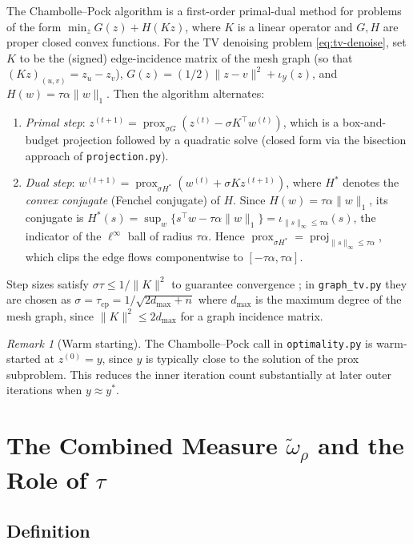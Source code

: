 \documentclass[11pt]{article}
\newcommand{\proj}{\operatorname{proj}}
\newcommand{\prox}{\operatorname{prox}}
\theoremstyle{plain}
\theoremstyle{remark}
\newtheorem{remark}{Remark}
\begin{document}
The Chambolle--Pock algorithm \cite{ChaPoc11} is a first-order primal-dual
method for problems of the form $\min_z G(z) + H(Kz)$, where $K$ is a linear
operator and $G,H$ are proper closed convex functions.  For the TV denoising
problem \eqref{eq:tv-denoise}, set $K$ to be the (signed) edge-incidence
matrix of the mesh graph (so that $(Kz)_{(u,v)} = z_u - z_v$), $G(z) =
(1/2)\|z-v\|^2 + \iota_{\mathcal{Y}}(z)$, and $H(w) = \tau\alpha\|w\|_1$.
Then the algorithm alternates:
\begin{enumerate}
  \item \emph{Primal step}: $z^{(t+1)} = \prox_{\sigma G}(z^{(t)} - \sigma K^\top w^{(t)})$,
    which is a box-and-budget projection followed by a quadratic solve
    (closed form via the bisection approach of \texttt{projection.py}).
  \item \emph{Dual step}: $w^{(t+1)} = \prox_{\sigma H^*}(w^{(t)} + \sigma K z^{(t+1)})$,
    where $H^*$ denotes the \emph{convex conjugate} (Fenchel conjugate) of $H$.
    Since $H(w) = \tau\alpha\|w\|_1$, its conjugate is
    $H^*(s) = \sup_w\{s^\top w - \tau\alpha\|w\|_1\} = \iota_{\|s\|_\infty \leq \tau\alpha}(s)$,
    the indicator of the $\ell^\infty$ ball of radius $\tau\alpha$.
    Hence $\prox_{\sigma H^*} = \proj_{\|s\|_\infty \leq \tau\alpha}$,
    which clips the edge flows componentwise to $[-\tau\alpha, \tau\alpha]$.
\end{enumerate}
Step sizes satisfy $\sigma\tau \leq 1/\|K\|^2$ to guarantee convergence
\cite{ChaPoc11}; in \texttt{graph\_tv.py} they are chosen as $\sigma = \tau_{\mathrm{cp}}
= 1/\sqrt{2d_{\max} + n}$ where $d_{\max}$ is the maximum degree of the mesh
graph, since $\|K\|^2 \leq 2d_{\max}$ for a graph incidence matrix.

\begin{remark}[Warm starting]
  The Chambolle--Pock call in \texttt{optimality.py} is warm-started at
  $z^{(0)} = y$, since $y$ is typically close to the solution of the prox
  subproblem.  This reduces the inner iteration count substantially at later
  outer iterations when $y \approx y^*$.
\end{remark}

\section{The Combined Measure $\widetilde{\omega}_\rho$ and the Role of $\tau$}
\label{sec:omega}

\subsection{Definition}
\end{document}
